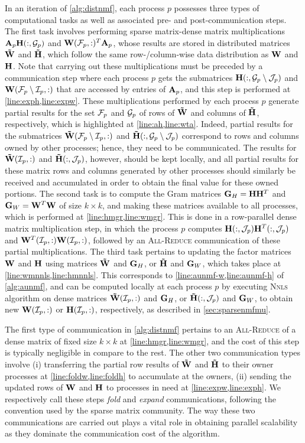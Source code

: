 In an iteration of \cref{alg:distnmf}, each process $p$ possesses three types of computational tasks as well as associated pre- and post-communication steps.
The first task involves performing sparse matrix-dense matrix multiplications $\mathbf{A}_p \mathbf{H}(:, \mathcal{G}_p)$ and $\mathbf{W}(\mathcal{F}_p, :)^T \mathbf{A}_p$, whose results are stored in distributed matrices $\mathbf{\tilde{W}}$ and $\mathbf{\tilde{H}}$, which follow the same row-/column-wise data distribution as $\mathbf{W}$ and $\mathbf{H}$.
Note that carrying out these multiplications must be preceded by a communication step where each process $p$ gets the submatrices $\mathbf{H}(:, \mathcal{G}_p \setminus \mathcal{J}_p)$ and $\mathbf{W}(\mathcal{F}_p \setminus \mathcal{I}_p, :)$ that are accessed by entries of $\mathbf{A}_p$, and this step is performed at \cref{line:exph,line:expw}.
These multiplications performed by each process $p$ generate partial results for the set $\mathcal{F}_p$ and $\mathcal{G}_p$ of rows of $\mathbf{\tilde{W}}$ and columns of $\mathbf{\tilde{H}}$, respectively, which is highlighted at \cref{line:ah,line:wta}.
Indeed, partial results for the submatrices $\mathbf{\tilde{W}}(\mathcal{F}_p \setminus \mathcal{I}_p, :)$ and $\mathbf{\tilde{H}}(:, \mathcal{G}_p \setminus \mathcal{J}_p)$ correspond to rows and columns owned by other processes; hence, they need to be communicated.
The results for $\mathbf{\tilde{W}}(\mathcal{I}_p, :)$ and $\mathbf{\tilde{H}}(:, \mathcal{J}_p)$, however, should be kept locally, and all partial results for these matrix rows and columns generated by other processes should similarly be received and accumulated in order to obtain the final value for these owned portions.
The second task is to compute the Gram matrices $\mathbf{G}_H = \mathbf{H} \mathbf{H}^T$ and $\mathbf{G}_W = \mathbf{W}^T \mathbf{W}$ of size $k \times k$, and making these matrices available to all processes, which is performed at \cref{line:hmgr,line:wmgr}.
This is done in a row-parallel dense matrix multiplication step, in which the process $p$ computes $\mathbf{H}(:, \mathcal{J}_p) \mathbf{H}^T(:, \mathcal{J}_p)$ and $\mathbf{W}^T(\mathcal{I}_p, :) \mathbf{W}(\mathcal{I}_p, :)$, followed by an \textsc{All-Reduce} communication of these partial multiplications.
The third task pertains to updating the factor matrices $\mathbf{W}$ and $\mathbf{H}$ using matrices $\mathbf{\tilde{W}}$ and $\mathbf{G}_H$, or $\mathbf{\tilde{H}}$ and $\mathbf{G}_W$, which takes place at \cref{line:wmnnls,line:hmnnls}.
This corresponds to \cref{line:aunmf-w,line:aunmf-h} of \cref{alg:aunmf}, and can be computed locally at each process $p$ by executing \textsc{Nnls} algorithm on dense matrices $\mathbf{\tilde{W}}(\mathcal{I}_p, :)$ and $\mathbf{G}_H$, or $\mathbf{\tilde{H}}(:, \mathcal{J}_p)$ and $\mathbf{G}_W$, to obtain new $\mathbf{W}(\mathcal{I}_p, :)$ or $\mathbf{H}(\mathcal{I}_p, :)$, respectively, as described in \cref{sec:sparsenmfmu}.

The first type of communication in \cref{alg:distnmf} pertains to an \textsc{All-Reduce} of a dense matrix of fixed size $k \times k$ at \cref{line:hmgr,line:wmgr}, and the cost of this step is typically negligible in compare to the rest.
The other two communication types involve (i) transferring the partial row results of $\mathbf{\tilde{W}}$ and $\mathbf{\tilde{H}}$ to their owner processes at \cref{line:foldw,line:foldh} to accumulate at the owners, (ii) sending the updated rows of $\mathbf{W}$ and $\mathbf{H}$ to processes in need at \cref{line:expw,line:exph}.
We respectively call these steps \emph{fold} and \emph{expand} communications, following the convention used by the sparse matrix community.
The way these two communications are carried out plays a vital role in obtaining parallel scalability as they dominate the communication cost of the algorithm.


